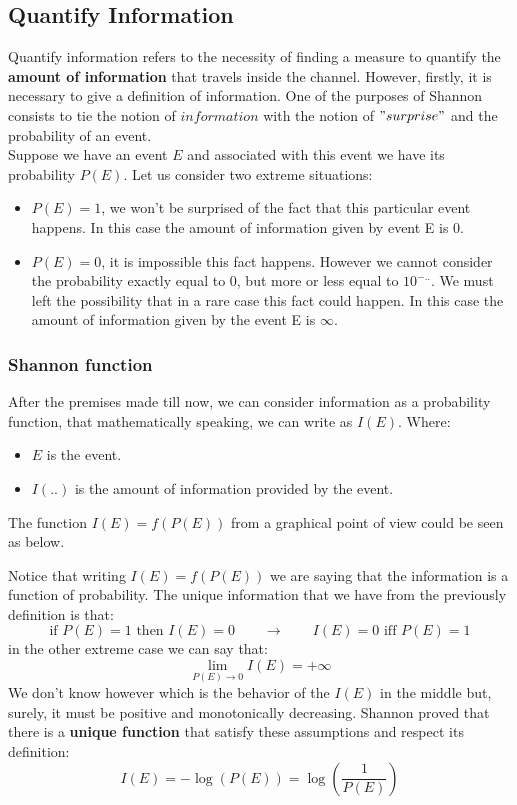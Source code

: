 \subsection{Quantify Information}
Quantify information refers to the necessity of finding a measure to quantify the \textbf{amount of information} that travels inside the channel. However, firstly, it is necessary to give a definition of information.
One of the purposes of Shannon consists to tie the notion of $information$ with the notion of $"surprise"$ and the probability of an event.\\
Suppose we have an event $E$ and associated with this event we have its probability $P(E)$. Let us consider two extreme situations:
\begin{itemize}
	\item $P(E) = 1$, we won't be surprised of the fact that this particular event happens. In this case the amount of information given by event E is 0.
	\item $P(E) = 0$, it is impossible this fact happens. However we cannot consider the probability exactly equal to 0, but more or less equal to $10^{-..}$. We must left the possibility that in a rare case this fact could happen. In this case the amount of information given by the event E is $\infty$.
\end{itemize}
\subsubsection{Shannon function} After the premises made till now, we can consider information as a probability function, that mathematically speaking, we can write as $I(E)$. Where:
\begin{itemize}
	\item $E$ is the event.
	\item $I(..)$ is the amount of information provided by the event. 
\end{itemize}
The function $I(E) = f(P(E))$ from a graphical point of view could be seen as below.

Notice that writing $I(E)= f(P(E))$ we are saying that the information is a function of probability.
The unique information that we have from the previously definition is that:
$$\text{if }P(E) = 1 \text{ then } I(E)=0 \qquad \longrightarrow \qquad I(E)=0 \text{ iff } P(E)=1$$
in the other extreme case we can say that:
$$\lim_{P(E)\rightarrow 0} I(E) = +\infty$$
We don't know however which is the behavior of the $I(E)$ in the middle but, surely, it must be positive and monotonically decreasing. Shannon proved that there is a \textbf{unique function} that satisfy these assumptions and respect its definition:
$$I(E) = -\log(P(E)) = \log\left(\frac{1}{P(E)}\right)$$

